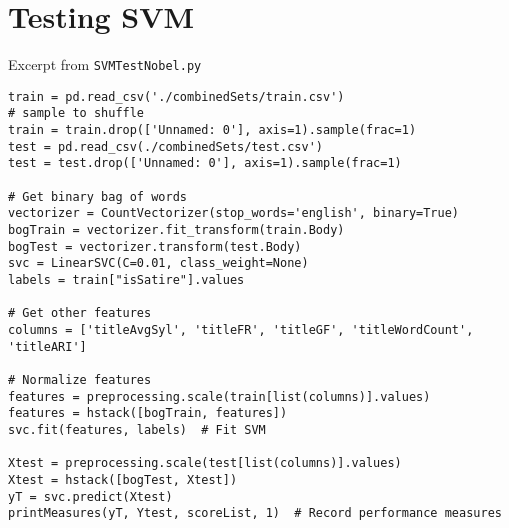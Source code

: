 \documentclass [12 pt] {report}
\begin{document}
\section{Testing SVM}
Excerpt from \texttt{SVMTestNobel.py}
\begin{lstlisting}
train = pd.read_csv('./combinedSets/train.csv')
# sample to shuffle
train = train.drop(['Unnamed: 0'], axis=1).sample(frac=1)  
test = pd.read_csv(./combinedSets/test.csv')
test = test.drop(['Unnamed: 0'], axis=1).sample(frac=1)

# Get binary bag of words
vectorizer = CountVectorizer(stop_words='english', binary=True)
bogTrain = vectorizer.fit_transform(train.Body)
bogTest = vectorizer.transform(test.Body)
svc = LinearSVC(C=0.01, class_weight=None)
labels = train["isSatire"].values

# Get other features
columns = ['titleAvgSyl', 'titleFR', 'titleGF', 'titleWordCount', 'titleARI']

# Normalize features
features = preprocessing.scale(train[list(columns)].values)  
features = hstack([bogTrain, features])
svc.fit(features, labels)  # Fit SVM

Xtest = preprocessing.scale(test[list(columns)].values)
Xtest = hstack([bogTest, Xtest])
yT = svc.predict(Xtest)
printMeasures(yT, Ytest, scoreList, 1)  # Record performance measures
\end{lstlisting}

\newpage
\end{document}
